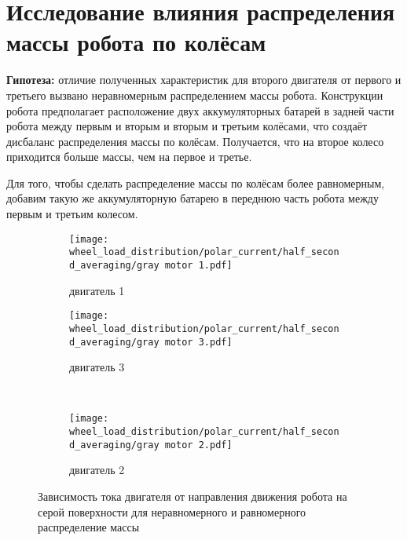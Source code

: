 \section{Исследование влияния распределения массы робота по колёсам}

{\bfseries Гипотеза:} отличие полученных характеристик для второго двигателя от первого и третьего вызвано неравномерным распределением массы робота. 
Конструкции робота предполагает расположение двух аккумуляторных батарей в задней части робота между первым и вторым и вторым и третьим колёсами, что создаёт дисбаланс распределения массы по колёсам.
Получается, что на второе колесо приходится больше массы, чем на первое и третье.

Для того, чтобы сделать распределение массы по колёсам более равномерным, добавим такую же аккумуляторную батарею в переднюю часть робота между первым и третьим колесом.

\begin{figure}[H]
    \centering
    \begin{subfigure}{0.49\textwidth}
        \centering
        \texttt{[image: wheel\_load\_distribution/polar\_current/half\_second\_averaging/gray motor 1.pdf]}
        \caption{двигатель 1}
    \end{subfigure}
    \hspace{0.005\textwidth}
    \begin{subfigure}{0.49\textwidth}
        \centering
        \texttt{[image: wheel\_load\_distribution/polar\_current/half\_second\_averaging/gray motor 3.pdf]}
        \caption{двигатель 3}
    \end{subfigure} \\
    \vspace{4pt}
    \centering
    \begin{subfigure}{0.49\textwidth}
        \centering
        \texttt{[image: wheel\_load\_distribution/polar\_current/half\_second\_averaging/gray motor 2.pdf]}
        \caption{двигатель 2}
    \end{subfigure}
    \caption{Зависимость тока двигателя от направления движения робота на серой поверхности для неравномерного и равномерного распределение массы}
\end{figure}

